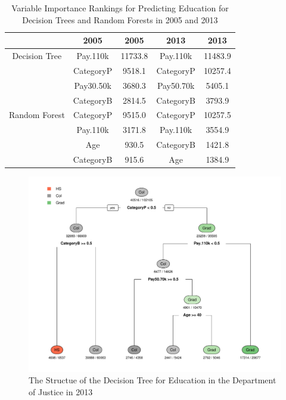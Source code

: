 \documentclass{article}
\begin{document}
    \begin{center}
        \begin{table}
            \centering
            \begin{tabular}{ |c|c|c|c|c| }
                \hline
                & 2005 & 2005 & 2013 & 2013 \\
                \hline
                Decision Tree & Pay.110k & 11733.8 & Pay.110k & 11483.9 \\
                & CategoryP & 9518.1 & CategoryP & 10257.4 \\
                & Pay30.50k & 3680.3 & Pay50.70k & 5405.1 \\
                & CategoryB & 2814.5 & CategoryB & 3793.9 \\
                \hline
                Random Forest & CategoryP & 9515.0 & CategoryP & 10257.5 \\
                & Pay.110k & 3171.8 & Pay.110k & 3554.9 \\
                & Age & 930.5 & CategoryB & 1421.8 \\
                & CategoryB & 915.6 & Age & 1384.9 \\
                \hline
            \end{tabular}
            \caption{Variable Importance Rankings for Predicting Education for Decision Trees and Random Forests in 2005 and 2013}
            \label{tab:10}
        \end{table}
    \end{center}

    \begin{center}
        \begin{figure}
            \includegraphics[scale=0.4]{./images/edu-decision-tree-2013.pdf}
            \caption{The Structue of the Decision Tree for Education in the Department of Justice in 2013}
            \label{edudesctree2013}
        \end{figure}
    \end{center}
\end{document}
